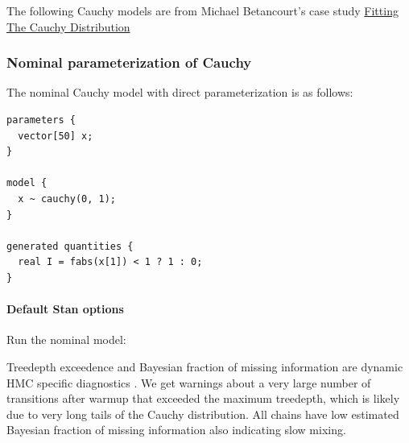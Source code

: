 \documentclass[american,]{article}
\let\oldparagraph\paragraph
\renewcommand{\paragraph}[1]{\oldparagraph{#1}\mbox{}}
\begin{document}
The following Cauchy models are from Michael Betancourt's case study
\href{https://betanalpha.github.io/assets/case_studies/fitting_the_cauchy.html}{Fitting
The Cauchy Distribution}

\hypertarget{nominal-parameterization-of-cauchy}{%
\subsubsection{Nominal parameterization of
Cauchy}\label{nominal-parameterization-of-cauchy}}

The nominal Cauchy model with direct parameterization is as follows:

\begin{verbatim}
parameters {
  vector[50] x;
}

model {
  x ~ cauchy(0, 1);
}

generated quantities {
  real I = fabs(x[1]) < 1 ? 1 : 0;
}
\end{verbatim}

\hypertarget{default-stan-options}{%
\paragraph{Default Stan options}\label{default-stan-options}}

Run the nominal model:

Treedepth exceedence and Bayesian fraction of missing information are
dynamic HMC specific diagnostics \citep{betancourt2017conceptual}. We
get warnings about a very large number of transitions after warmup that
exceeded the maximum treedepth, which is likely due to very long tails
of the Cauchy distribution. All chains have low estimated Bayesian
fraction of missing information also indicating slow mixing.
\end{document}
